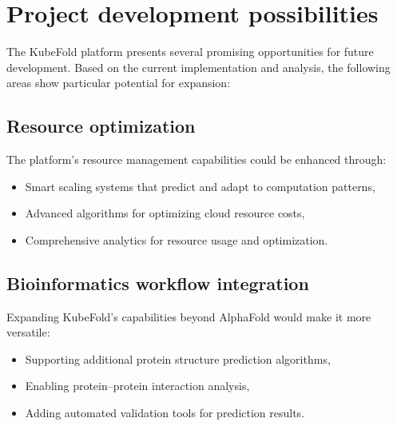 \section{Project development possibilities}

The KubeFold platform presents several promising opportunities for future development.
Based on the current implementation and analysis, the following areas show particular potential for expansion:

\subsection{Resource optimization}
The platform's resource management capabilities could be enhanced through:
\begin{itemize}
    \item Smart scaling systems that predict and adapt to computation patterns,
    \item Advanced algorithms for optimizing cloud resource costs,
    \item Comprehensive analytics for resource usage and optimization.
\end{itemize}

\subsection{Bioinformatics workflow integration}
Expanding KubeFold's capabilities beyond AlphaFold would make it more versatile:
\begin{itemize}
    \item Supporting additional protein structure prediction algorithms,
    \item Enabling protein--protein interaction analysis,
    \item Adding automated validation tools for prediction results.
\end{itemize}

